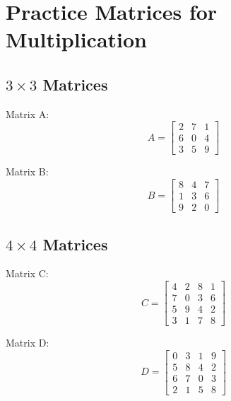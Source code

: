 \documentclass{article}
\begin{document}
\raggedright %

\section*{Practice Matrices for Multiplication}

\subsection*{\(3 \times 3\) Matrices}
Matrix A:
\[
A =
\begin{bmatrix}
2 & 7 & 1 \\
6 & 0 & 4 \\
3 & 5 & 9
\end{bmatrix}
\]

Matrix B:
\[
B =
\begin{bmatrix}
8 & 4 & 7 \\
1 & 3 & 6 \\
9 & 2 & 0
\end{bmatrix}
\]

\subsection*{\(4 \times 4\) Matrices}
Matrix C:
\[
C =
\begin{bmatrix}
4 & 2 & 8 & 1 \\
7 & 0 & 3 & 6 \\
5 & 9 & 4 & 2 \\
3 & 1 & 7 & 8
\end{bmatrix}
\]

Matrix D:
\[
D =
\begin{bmatrix}
0 & 3 & 1 & 9 \\
5 & 8 & 4 & 2 \\
6 & 7 & 0 & 3 \\
2 & 1 & 5 & 8
\end{bmatrix}
\]
\end{document}
